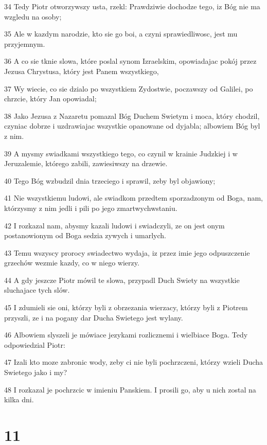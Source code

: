 \par 34 Tedy Piotr otworzywszy usta, rzekl: Prawdziwie dochodze tego, iz Bóg nie ma wzgledu na osoby;
\par 35 Ale w kazdym narodzie, kto sie go boi, a czyni sprawiedliwosc, jest mu przyjemnym.
\par 36 A co sie tknie slowa, które poslal synom Izraelskim, opowiadajac pokój przez Jezusa Chrystusa, który jest Panem wszystkiego,
\par 37 Wy wiecie, co sie dzialo po wszystkiem Zydostwie, poczawszy od Galilei, po chrzcie, który Jan opowiadal;
\par 38 Jako Jezusa z Nazaretu pomazal Bóg Duchem Swietym i moca, który chodzil, czyniac dobrze i uzdrawiajac wszystkie opanowane od dyjabla; albowiem Bóg byl z nim.
\par 39 A mysmy swiadkami wszystkiego tego, co czynil w krainie Judzkiej i w Jeruzalemie, którego zabili, zawiesiwszy na drzewie.
\par 40 Tego Bóg wzbudzil dnia trzeciego i sprawil, zeby byl objawiony;
\par 41 Nie wszystkiemu ludowi, ale swiadkom przedtem sporzadzonym od Boga, nam, którzysmy z nim jedli i pili po jego zmartwychwstaniu.
\par 42 I rozkazal nam, abysmy kazali ludowi i swiadczyli, ze on jest onym postanowionym od Boga sedzia zywych i umarlych.
\par 43 Temu wszyscy prorocy swiadectwo wydaja, iz przez imie jego odpuszczenie grzechów wezmie kazdy, co w niego wierzy.
\par 44 A gdy jeszcze Piotr mówil te slowa, przypadl Duch Swiety na wszystkie sluchajace tych slów.
\par 45 I zdumieli sie oni, którzy byli z obrzezania wierzacy, którzy byli z Piotrem przyszli, ze i na pogany dar Ducha Swietego jest wylany.
\par 46 Albowiem slyszeli je mówiace jezykami rozlicznemi i wielbiace Boga. Tedy odpowiedzial Piotr:
\par 47 Izali kto moze zabronic wody, zeby ci nie byli pochrzczeni, którzy wzieli Ducha Swietego jako i my?
\par 48 I rozkazal je pochrzcic w imieniu Panskiem. I prosili go, aby u nich zostal na kilka dni.

\chapter{11}

